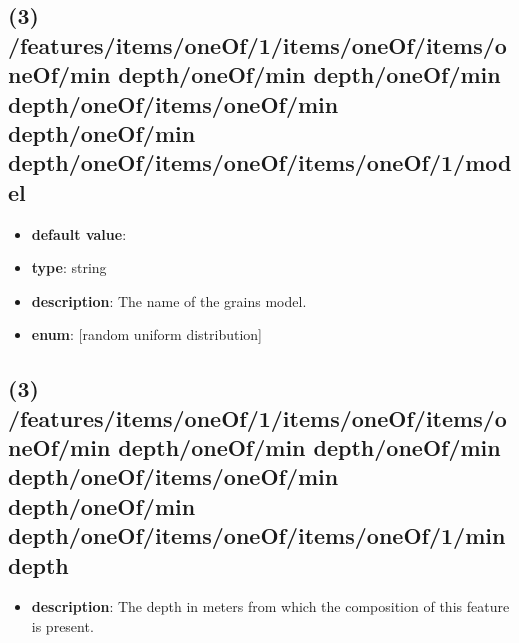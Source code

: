 \subsection{(3) /features/items/oneOf/1/items/oneOf/items/oneOf/min depth/oneOf/min depth/oneOf/min depth/oneOf/items/oneOf/min depth/oneOf/min depth/oneOf/items/oneOf/items/oneOf/1/model}
\begin{itemize}[leftmargin=3em]\item {\bf default value}: 
\item {\bf type}: string
\item {\bf description}: The name of the grains model.
\item {\bf enum}: [random uniform distribution]\end{itemize}\subsection{(3) /features/items/oneOf/1/items/oneOf/items/oneOf/min depth/oneOf/min depth/oneOf/min depth/oneOf/items/oneOf/min depth/oneOf/min depth/oneOf/items/oneOf/items/oneOf/1/min depth}
\begin{itemize}[leftmargin=3em]\item {\bf description}: The depth in meters from which the composition of this feature is present.
\end{itemize}

